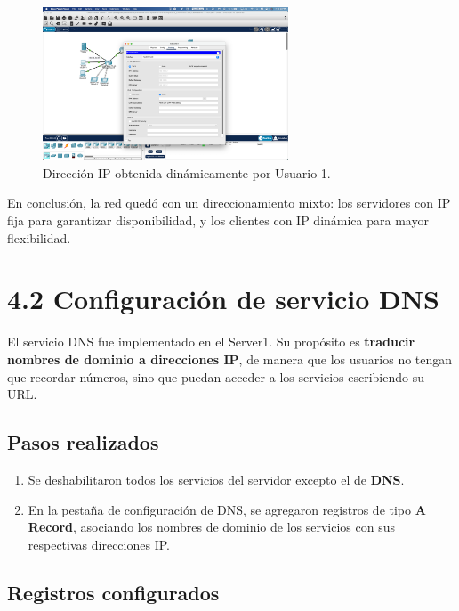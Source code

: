 \documentclass[10pt]{article}
\begin{document}
\begin{figure}[H]
    \centering
    \includegraphics[width=0.65\textwidth]{lab-01-screenshots/41-6-user1-ip.png}
    \caption{Dirección IP obtenida dinámicamente por Usuario 1.}
\end{figure}

\bigskip
En conclusión, la red quedó con un direccionamiento mixto: los servidores con IP fija para garantizar disponibilidad, y los clientes con IP dinámica para mayor flexibilidad.


\section{4.2 Configuración de servicio DNS}

El servicio DNS fue implementado en el Server1. Su propósito es \textbf{traducir nombres de dominio a direcciones IP}, de manera que los usuarios no tengan que recordar números, sino que puedan acceder a los servicios escribiendo su URL.

\subsection{Pasos realizados}

\begin{enumerate}
    \item Se deshabilitaron todos los servicios del servidor excepto el de \textbf{DNS}.
    \item En la pestaña de configuración de DNS, se agregaron registros de tipo \textbf{A Record}, asociando los nombres de dominio de los servicios con sus respectivas direcciones IP.
\end{enumerate}

\subsection{Registros configurados}
\end{document}
